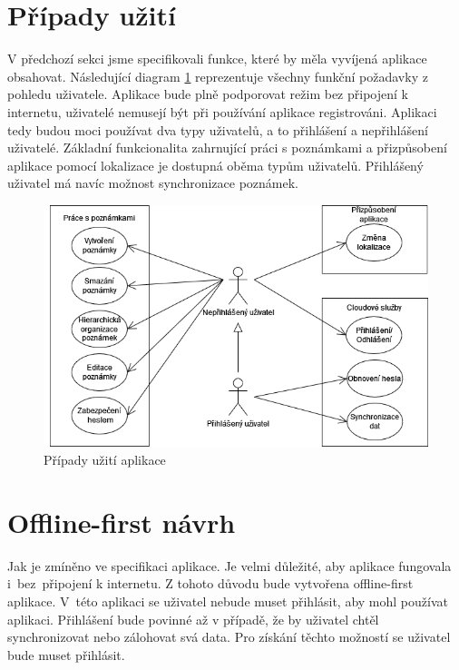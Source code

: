 \documentclass[czech, bc, kiv, he, iso690numb]{fasthesis}
\begin{document}
\section{Případy užití}

V předchozí sekci jsme specifikovali funkce, které by měla vyvíjená aplikace obsahovat. Následující diagram \ref{fig:usecases} reprezentuje všechny funkční požadavky z pohledu uživatele. Aplikace bude plně podporovat režim bez připojení k internetu, uživatelé nemusejí být při používání aplikace registrováni. Aplikaci tedy budou moci používat dva typy uživatelů, a to přihlášení a nepřihlášení uživatelé. Základní funkcionalita zahrnující práci s poznámkami a přizpůsobení aplikace pomocí lokalizace je dostupná oběma typům uživatelů. Přihlášený uživatel má navíc možnost synchronizace poznámek. 

\begin{figure}[h]
  \centering
  \includegraphics[width=1\textwidth]{img/BP-Runt/Planning/use_case_v01.png}
  \caption{Případy užití aplikace}
  \label{fig:usecases}
\end{figure}

\section{Offline-first návrh}

Jak je zmíněno ve specifikaci aplikace. Je velmi důležité, aby aplikace fungovala i~bez~připojení k internetu. Z tohoto důvodu bude vytvořena offline-first aplikace. V~této aplikaci se uživatel nebude muset přihlásit, aby mohl používat aplikaci. Přihlášení bude povinné až v případě, že by uživatel chtěl synchronizovat nebo zálohovat svá data. Pro získání těchto možností se uživatel bude muset přihlásit.
\end{document}
